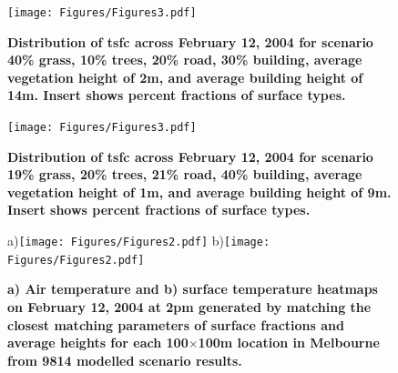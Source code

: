 \documentclass[final,3p,times,authoryear]{elsarticle}
\begin{document}
\begin{figure}
\centering
\texttt{[image: Figures/Figures3.pdf]}
\caption{\bf Distribution of \gls{tsfc} across February 12, 2004 for scenario 40\% grass, 10\% trees, 20\% road, 30\% building, average vegetation height of 2m, and average building height of 14m. Insert shows percent fractions of surface types.}
 \label{fig:dist6}
\end{figure}

\begin{figure}
\centering
\texttt{[image: Figures/Figures3.pdf]}
\caption{\bf Distribution of \gls{tsfc} across February 12, 2004 for scenario 19\% grass, 20\% trees, 21\% road, 40\% building, average vegetation height of 1m, and average building height of 9m. Insert shows percent fractions of surface types.}
 \label{fig:dist7}
\end{figure}


\begin{figure}
\centering
a)\texttt{[image: Figures/Figures2.pdf]}
b)\texttt{[image: Figures/Figures2.pdf]}
\caption{\bf a) Air temperature and b) surface temperature heatmaps on February 12, 2004 at 2pm generated by matching the closest matching parameters of surface fractions and average heights for each 100$\times$100m location in Melbourne from 9814 modelled scenario results.  }
 \label{fig:TaMelb}
\end{figure}





\end{document}
